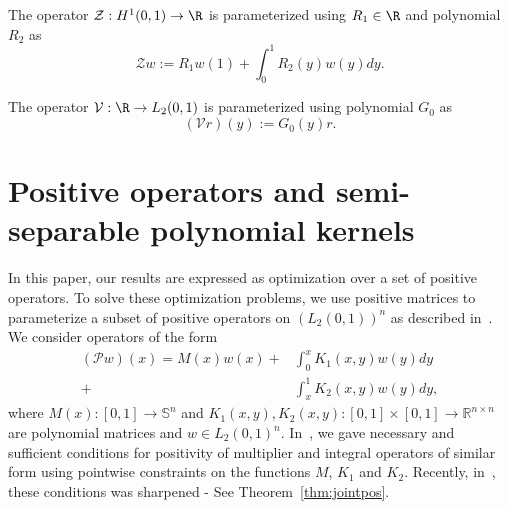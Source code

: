 \documentclass[9pt,journal,twocolumn]{IEEEtran}
\newcommand{\lt}{L_2(0,1)}
\begin{document}
The operator $\mathcal{Z}:H^1(0,1) \rightarrow \R$ is parameterized using  $R_1\in \R$ and  polynomial $R_2$ as
\begin{equation}
\mathcal{Z}w:= R_1 w(1) + \int_0^1 R_2(y)w(y)dy.
\end{equation}


The operator $\mathcal{V}:\R \rightarrow \lt$ is parameterized using polynomial $G_0$ as
\begin{equation}
\left(\mathcal{V}r\right)(y):=G_0(y)r.
\end{equation}
\section{Positive operators and semi-separable polynomial kernels}\label{subsec:positivity}

In this paper, our results are expressed as optimization over a set of positive operators. To solve these optimization problems, we use positive matrices to parameterize a subset of positive operators on $(\lt)^n$ as described in~\cite{peetlmi}. We consider operators of the form
\begin{align}
(\mathcal{P}w)(x)=M(x)w(x) +  &\int_0^x K_1(x,y) w(y) d y \nonumber \\
 +  &\label{eqn:Poperator}\int_x^1 K_2(x,y) w(y) d y, 
\end{align}
where $M(x):[0,1] \rightarrow \mathbb{S}^n$ and $K_1(x,y),K_2(x,y): [0,1] \times [0,1] \rightarrow \mathbb{R}^{n \times n}$ are polynomial matrices and $w \in \lt^n$.  In~\cite{peet2008using}, we gave necessary and sufficient conditions for positivity of multiplier and integral operators of similar form using pointwise constraints on the functions $M$, $K_1$ and $K_2$. Recently, in~\cite{peetlmi}, these conditions was sharpened - See Theorem~\ref{thm:jointpos}.
\end{document}
